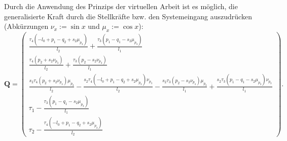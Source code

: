 Durch die Anwendung des Prinzips der virtuellen Arbeit ist es möglich, die generalisierte Kraft durch die Stellkräfte bzw. den Systemeingang auszudrücken (Abkürzungen $\nu_x := \sin{x}$ und $\mu_x := \cos{x}$):
\begin{equation}
\mathbf{Q}=
\left(\begin{smallmatrix}
\frac{\tau_{4} \left(- l_{0} + p_{1} - q_{2} + s_{2} \mu_{p_{3}}\right)}{l_{2}} + \frac{\tau_{3} \left(p_{1} - q_{1} - s_{2} \mu_{p_{3}}\right)}{l_{1}}\\
\frac{\tau_{4} \left(p_{2} + s_{2} \nu_{p_{3}}\right)}{l_{2}} + \frac{\tau_{3} \left(p_{2} - s_{2} \nu_{p_{3}}\right)}{l_{1}}\\
\frac{s_{2} \tau_{4} \left(p_{2} + s_{2} \nu_{p_{3}}\right) \mu_{p_{3} }}{l_{2}} - \frac{s_{2} \tau_{4} \left(- l_{0} + p_{1} - q_{2} + s_{2} \mu_{p_{3} }\right) \nu_{p_{3}}}{l_{2}} - \frac{s_{2} \tau_{3} \left(p_{2} - s_{2} \nu_{p_{3}}\right) \mu_{p_{3}}}{l_{1}} + \frac{s_{2} \tau_{3} \left(p_{1} - q_{1} - s_{2} \mu_{p_{3}}\right) \nu_{p_{3}}}{l_{1}}\\
\tau_{1} - \frac{\tau_{3} \left(p_{1} - q_{1} - s_{2} \mu_{p_{3} }\right)}{l_{1}}\\
\tau_{2} - \frac{\tau_{4} \left(- l_{0} + p_{1} - q_{2} + s_{2} \mu_{p_{3} }\right)}{l_{2}}
\end{smallmatrix}\right).
\end{equation}

